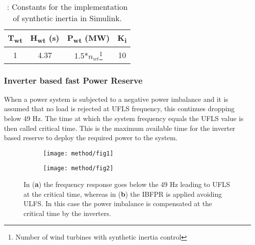 \begin{table}[h]
	\caption{\label{tb:inertia}: Constants for the implementation of synthetic inertia in Simulink.}
	\centering
	\begin{tabular}{cccc}
		\toprule
		\textbf{T\textsubscript{wt}} 	& \textbf{ H\textsubscript{wt} (s)}	& \textbf{ P\textsubscript{wt} (MW)}  & \textbf{ K\textsubscript{i}} \\
		\midrule
			1	       & 4.37		        &  1.5*$ n_{wt} $\footnote{Number of wind turbines with synthetic inertia control} & 10 \\
		\bottomrule
	\end{tabular}
\end{table}

\subsubsection{Inverter based fast Power Reserve}

When a power system is subjected to a negative power imbalance and it is assumed that no load is rejected at UFLS frequency, this continues dropping below 49 Hz. The time at which the system frequency equals the UFLS value is then called critical time. This is the maximum available time for the inverter based reserve to deploy the required power to the system. \\

\begin{figure}[h]
	\centering
	\begin{subfigure}[h]{0.45\textwidth}
		\centering
		\texttt{[image: method/fig1]}
		\caption{}
		\label{fig:freqresp_before}
	\end{subfigure}
	\hfill
	\begin{subfigure}[h]{0.45\textwidth}
		\centering
		\texttt{[image: method/fig2]}
		\caption{}
		\label{fig:freqresp_after}
	\end{subfigure}


	\caption{In (\textbf{a}) the frequency response goes below the 49 Hz leading to UFLS at the critical time, whereas in (\textbf{b}) the IBFPR is applied avoiding ULFS. In this case the power imbalance is compensated at the critical time by the inverters.}
\end{figure}

